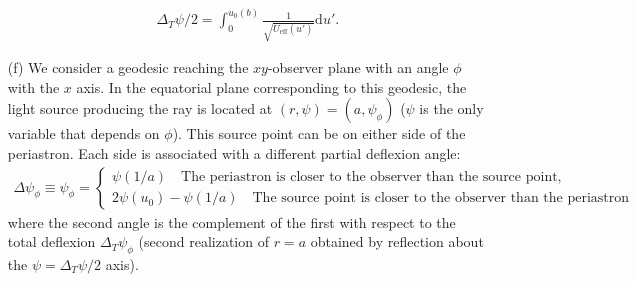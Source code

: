 \documentclass[10pt, a4paper]{article}
\begin{document}
\begin{enumerate}
  \begin{align*}
    \Delta_T \psi/2 = \int_{0}^{u_0(b)} \frac{1}{\sqrt{U_{\text{eff}}(u')}}\text{d}u'. 
  \end{align*}
  \item[(f)]  We consider a geodesic reaching the $xy$-observer plane with an angle $\phi$ with the $x$ axis. In the equatorial plane corresponding to this geodesic, the light source producing the ray is located at $(r, \psi) = (a, \psi_\phi)$ ($\psi$ is the only variable that depends on $\phi$). This source point can be on either side of the periastron. Each side is associated with a different partial deflexion angle:
  \begin{align*}
  \Delta \psi_\phi \equiv \psi_\phi=\left\{\begin{array}{l}\psi(1/a) \quad \text{The periastron is closer to the observer than the source point,} \\ 2\psi\left(u_0\right)-\psi\left(1 / a\right)\quad \text{The source point is closer to the observer than the periastron}\end{array}\right.
  \end{align*}
  where the second angle is the complement of the first with respect to the total deflexion $\Delta_T \psi_\phi$ (second realization of $r = a$ obtained by reflection about the $\psi = \Delta_T \psi/2$ axis). 
\end{enumerate}
\newpage
\end{document}
